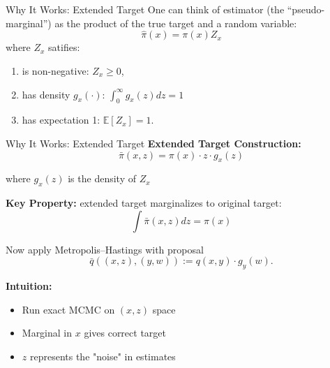 \begin{frame}{Why It Works: Extended Target}
	One can think of estimator (the “pseudo-marginal”) as the product of the true target and a random variable:
	\begin{equation*}
		\hat{\pi}(x) = \pi(x) Z_x
	\end{equation*}
	where $Z_x$ satifies:
	\begin{enumerate}
		\item is non-negative: $Z_x \geq 0$,
		\item has density $g_x(\cdot)$: $\int_0^{\infty} g_x(z)dz = 1$
		\item has expectation 1: $\mathbb{E}[Z_x] = 1$.
	\end{enumerate}
\end{frame}

\begin{frame}{Why It Works: Extended Target}
	\textbf{Extended Target Construction:}
	\begin{equation*}
		\bar{\pi}(x,z) = \pi(x) \cdot z \cdot g_x(z)
	\end{equation*}

	where $g_x(z)$ is the density of $Z_x$

	\vspace{0.2cm}
	\textbf{Key Property:} extended target marginalizes to original target:
	\begin{equation*}
		\int \bar{\pi}(x,z) dz = \pi(x)
	\end{equation*}

	Now apply Metropolis–Hastings with proposal
	\begin{equation*}
		\bar{q}((x, z), (y, w)) := q(x, y) \cdot g_y(w).
	\end{equation*}

	\vspace{0.2cm}
	\textbf{Intuition:}
	\begin{itemize}
		\item Run exact MCMC on $(x,z)$ space
		\item Marginal in $x$ gives correct target
		\item $z$ represents the "noise" in estimates
	\end{itemize}
\end{frame}

